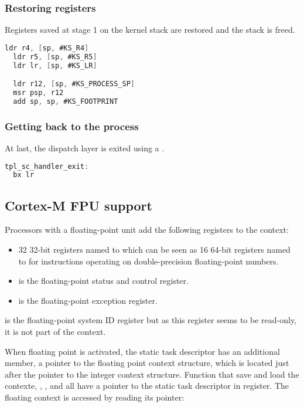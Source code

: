 \subsubsection{Restoring registers}

Registers saved at stage 1 on the kernel stack are restored and the stack is freed.

\begin{lstlisting}[language=C]
  ldr r4, [sp, #KS_R4]
  ldr r5, [sp, #KS_R5]
  ldr lr, [sp, #KS_LR]

  ldr r12, [sp, #KS_PROCESS_SP]
  msr psp, r12
  add sp, sp, #KS_FOOTPRINT	
\end{lstlisting}

\subsubsection{Getting back to the process}

At last, the dispatch layer is exited using a .

\begin{lstlisting}[language=C]
tpl_sc_handler_exit:
  bx lr
\end{lstlisting}

\subsection{Cortex-M FPU support}

Processors with a floating-point unit add the following registers to the context:
\begin{itemize}
\item 32 32-bit registers named  to  which can be seen as 16 64-bit registers named  to  for instructions operating on double-precision floating-point numbers.
\item {} is the floating-point status and control register.
\item {} is the floating-point exception register.
\end{itemize}

 is the floating-point system ID register but as this register seems to be read-only, it is not part of the context.

When floating point is activated, the static task descriptor has an additional member, a pointer to the floating point context structure, which is located just after the pointer to the integer context structure. Function that save and load the contexte, , ,  and  all have a pointer to the static task descriptor in  register. The floating context is accessed by reading its pointer:


